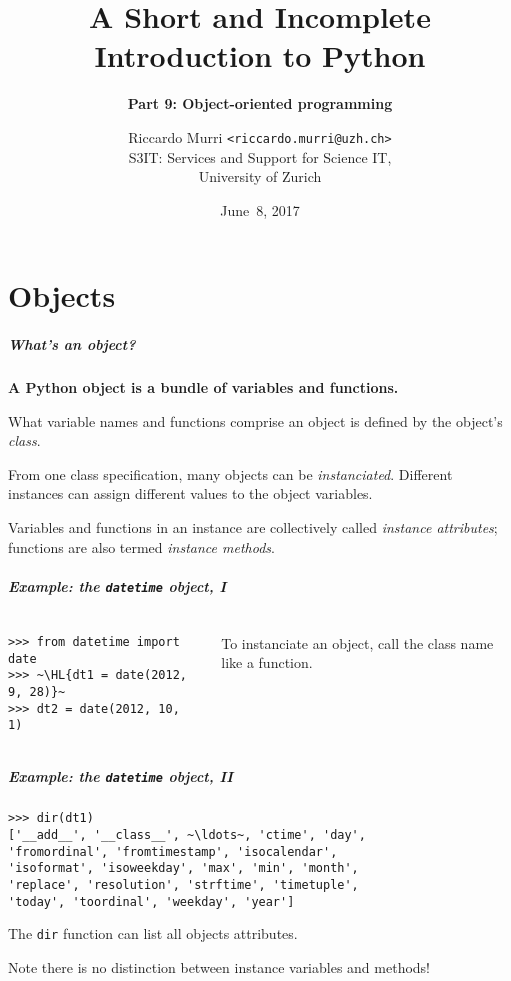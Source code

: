 \documentclass[english,serif,mathserif,xcolor=pdftex,dvipsnames,table]{beamer}
\title[9. Object-orientation]{%
  A Short and Incomplete Introduction to Python
}
\subtitle{\bfseries Part 9: Object-oriented programming}
\author[R.~Murri]{%
  Riccardo Murri \texttt{<riccardo.murri@uzh.ch>}
  \\
  S3IT: Services and Support for Science IT,
  \\
  University of Zurich
}
\date{June~8, 2017}
\begin{document}
\maketitle


\part{Objects}

\begin{frame}
  \frametitle{What's an \emph{object}?}
  \textbf{A Python object is a bundle of variables and functions.}

  \+
  What variable names and functions comprise an object is defined
  by the object's \emph{class}.

  \+
  From one class specification, many objects can be
  \emph{instanciated}.  Different instances can assign different
  values to the object variables.

  \+
  Variables and functions in an instance are collectively called
  \emph{instance attributes}; functions are also termed \emph{instance
    methods}.
\end{frame}


\begin{frame}[fragile]
  \frametitle{Example: the \texttt{datetime} object, I}
  \begin{columns}[c]
    \begin{column}{0.5\textwidth}
\begin{lstlisting}
>>> from datetime import date
>>> ~\HL{dt1 = date(2012, 9, 28)}~
>>> dt2 = date(2012, 10, 1)
\end{lstlisting}
    \end{column}
    \begin{column}{0.5\textwidth}
      \raggedleft
      To instanciate an object, call the class name like a
      function.
    \end{column}
  \end{columns}
\end{frame}


\begin{frame}[fragile]
  \frametitle{Example: the \texttt{datetime} object, II}
\begin{lstlisting}
>>> dir(dt1)
['__add__', '__class__', ~\ldots~, 'ctime', 'day',
'fromordinal', 'fromtimestamp', 'isocalendar',
'isoformat', 'isoweekday', 'max', 'min', 'month',
'replace', 'resolution', 'strftime', 'timetuple',
'today', 'toordinal', 'weekday', 'year']
\end{lstlisting}

  \+
  The \texttt{dir} function can list all objects attributes.

  \+
  Note there is no distinction between instance variables and
  methods!
\end{frame}
\end{document}
